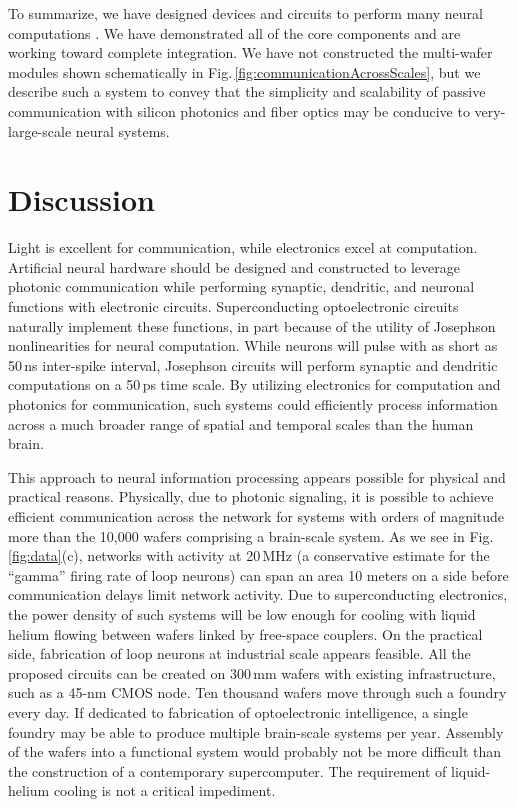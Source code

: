 \documentclass[twocolumn]{article}
\begin{document}
To summarize, we have designed devices and circuits to perform many neural computations \cite{sh2018,sh2018_full}. We have demonstrated all of the core components and are working toward complete integration. We have not constructed the multi-wafer modules shown schematically in Fig.\,\ref{fig:communicationAcrossScales}, but we describe such a system to convey that the simplicity and scalability of passive communication with silicon photonics and fiber optics may be conducive to very-large-scale neural systems. 

\section{\label{sec:discussion}Discussion}
Light is excellent for communication, while electronics excel at computation. Artificial neural hardware should be designed and constructed to leverage photonic communication while performing synaptic, dendritic, and neuronal functions with electronic circuits. Superconducting optoelectronic circuits naturally implement these functions, in part because of the utility of Josephson nonlinearities for neural computation. While neurons will pulse with as short as 50\,ns inter-spike interval, Josephson circuits will perform synaptic and dendritic computations on a 50\,ps time scale. By utilizing electronics for computation and photonics for communication, such systems could efficiently process information across a much broader range of spatial and temporal scales than the human brain. 

This approach to neural information processing appears possible for physical and practical reasons. Physically, due to photonic signaling, it is possible to achieve efficient communication across the network for systems with orders of magnitude more than the 10,000 wafers comprising a brain-scale system. As we see in Fig.\,\ref{fig:data}(c), networks with activity at 20\,MHz (a conservative estimate for the ``gamma'' firing rate of loop neurons) can span an area 10 meters on a side before communication delays limit network activity. Due to superconducting electronics, the power density of such systems will be low enough for cooling with liquid helium flowing between wafers linked by free-space couplers. On the practical side, fabrication of loop neurons at industrial scale appears feasible. All the proposed circuits can be created on 300\,mm wafers with existing infrastructure, such as a 45-nm CMOS node. Ten thousand wafers move through such a foundry every day. If dedicated to fabrication of optoelectronic intelligence, a single foundry may be able to produce multiple brain-scale systems per year. Assembly of the wafers into a functional system would probably not be more difficult than the construction of a contemporary supercomputer. The requirement of liquid-helium cooling is not a critical impediment.
\end{document}
